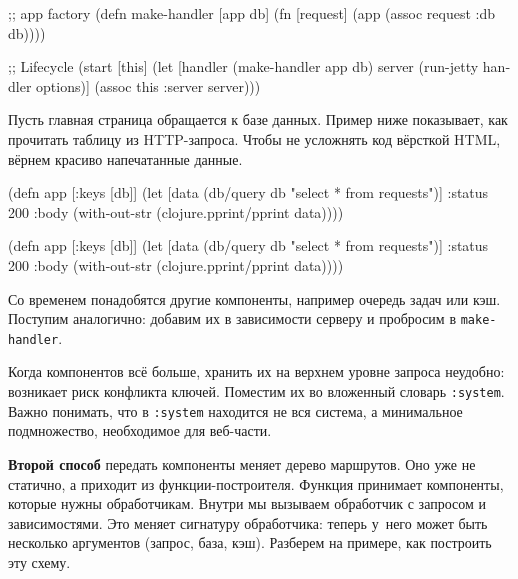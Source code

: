 \else

\begin{english}
  \begin{clojure}
;; app factory
(defn make-handler [app db]
  (fn [request]
    (app (assoc request :db db))))

;; Lifecycle
(start [this]
  (let [handler (make-handler app db)
        server (run-jetty handler options)]
    (assoc this :server server)))
  \end{clojure}
\end{english}

\fi

Пусть главная страница обращается к базе данных. Пример ниже показывает, как
прочитать таблицу из HTTP-запроса. Чтобы не усложнять код вёрсткой HTML, вёрнем
красиво напечатанные данные.

\ifnarrow

\begin{english}
  \begin{clojure}
(defn app [{:keys [db]}]
  (let [data (db/query db
               "select * from requests")]
    {:status 200
     :body (with-out-str
             (clojure.pprint/pprint
               data))}))
  \end{clojure}
\end{english}

\else

\begin{english}
  \begin{clojure}
(defn app [{:keys [db]}]
  (let [data (db/query db "select * from requests")]
    {:status 200
     :body (with-out-str
             (clojure.pprint/pprint data))}))
  \end{clojure}
\end{english}

\fi

Со временем понадобятся другие компоненты, например очередь задач или
кэш. Поступим аналогично: добавим их в зависимости серверу и пробросим в
\verb|make-handler|.


Когда компонентов всё больше, хранить их на верхнем уровне запроса неудобно:
возникает риск конфликта ключей. Поместим их во вложенный словарь
\verb|:system|. Важно понимать, что в \verb|:system| находится не вся система, а
минимальное подмножество, необходимое для веб-части.

\textbf{Второй способ} передать компоненты меняет дерево маршрутов. Оно уже не
статично, а приходит из функции-построителя. Функция принимает компоненты,
которые нужны обработчикам. Внутри мы вызываем обработчик с запросом и
зависимостями. Это меняет сигнатуру обработчика: теперь у~него может быть
несколько аргументов (запрос, база, кэш). Разберем на примере, как построить эту
схему.

